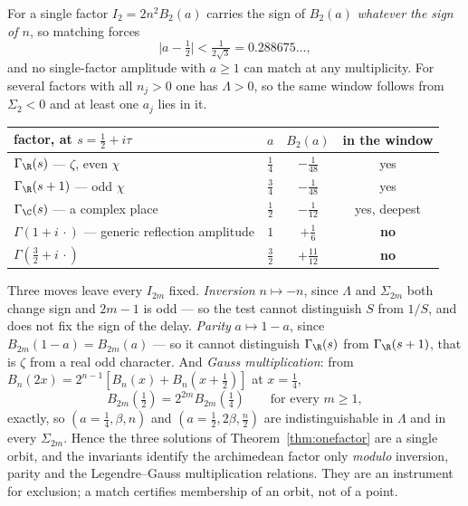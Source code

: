 \begin{corollary}\label{cor:signrule}
For a single factor $I_2=2n^2B_2(a)$ carries the sign of $B_2(a)$ \emph{whatever
the sign of $n$}, so matching forces
\[
 \Big|a-\tfrac12\Big|<\tfrac1{2\sqrt3}=0.288675\ldots,
\]
and no single-factor amplitude with $a\geq1$ can match at any multiplicity. For
several factors with all $n_j>0$ one has $\Lambda>0$, so the same window follows
from $\Sigma_2<0$ and at least one $a_j$ lies in it.
\end{corollary}

\begin{center}
\begin{tabular}{@{}lccc@{}}
\toprule
factor, at $s=\frac12+i\tau$ & $a$ & $B_2(a)$ & in the window\\
\midrule
$\Gamma_\R(s)$ --- $\zeta$, even $\chi$ & $\frac14$ & $-\frac1{48}$ & yes\\
$\Gamma_\R(s+1)$ --- odd $\chi$ & $\frac34$ & $-\frac1{48}$ & yes\\
$\Gamma_\C(s)$ --- a complex place & $\frac12$ & $-\frac1{12}$ & yes, deepest\\
$\Gamma(1+i\,\cdot)$ --- generic reflection amplitude & $1$ & $+\frac16$ & \textbf{no}\\
$\Gamma(\frac32+i\,\cdot)$ & $\frac32$ & $+\frac{11}{12}$ & \textbf{no}\\
\bottomrule
\end{tabular}
\end{center}

\begin{remark}\label{rem:degeneracy}
Three moves leave every $I_{2m}$ fixed. \emph{Inversion} $n\mapsto-n$, since
$\Lambda$ and $\Sigma_{2m}$ both change sign and $2m-1$ is odd --- so the test
cannot distinguish $S$ from $1/S$, and does not fix the sign of the delay.
\emph{Parity} $a\mapsto1-a$, since $B_{2m}(1-a)=B_{2m}(a)$ --- so it cannot
distinguish $\Gamma_\R(s)$ from $\Gamma_\R(s+1)$, that is $\zeta$ from a real odd
character. And \emph{Gauss multiplication}: from $B_n(2x)=2^{n-1}[B_n(x)+B_n(x+\frac12)]$
at $x=\frac14$,
\[
 B_{2m}(\tfrac12)=2^{2m}B_{2m}(\tfrac14)\qquad\text{for every }m\geq1,
\]
exactly, so $(a{=}\frac14,\beta,n)$ and $(a{=}\frac12,2\beta,\frac n2)$ are
indistinguishable in $\Lambda$ and in every $\Sigma_{2m}$. Hence the three
solutions of Theorem~\ref{thm:onefactor} are a single orbit, and the invariants
identify the archimedean factor only \emph{modulo} inversion, parity and the
Legendre--Gauss multiplication relations. They are an instrument for exclusion; a
match certifies membership of an orbit, not of a point.
\end{remark}

